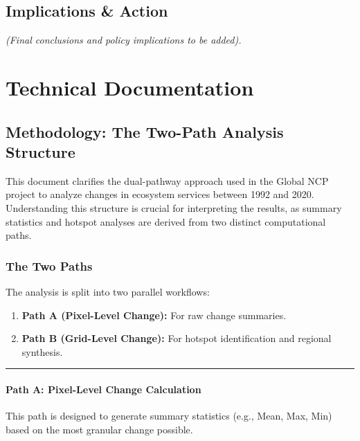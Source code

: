 \documentclass[
  letterpaper,
  DIV=11,
  numbers=noendperiod]{scrreprt}
\providecommand{\tightlist}{%
  \setlength{\itemsep}{0pt}\setlength{\parskip}{0pt}}
\begin{document}
\chapter{Implications \& Action}\label{implications-action}

\emph{(Final conclusions and policy implications to be added).}

\part{Technical Documentation}

\chapter{Methodology: The Two-Path Analysis
Structure}\label{methodology-the-two-path-analysis-structure}

This document clarifies the dual-pathway approach used in the Global NCP
project to analyze changes in ecosystem services between 1992 and 2020.
Understanding this structure is crucial for interpreting the results, as
summary statistics and hotspot analyses are derived from two distinct
computational paths.

\section{The Two Paths}\label{the-two-paths}

The analysis is split into two parallel workflows:

\begin{enumerate}
\def\labelenumi{\arabic{enumi}.}
\tightlist
\item
  \textbf{Path A (Pixel-Level Change):} For raw change summaries.
\item
  \textbf{Path B (Grid-Level Change):} For hotspot identification and
  regional synthesis.
\end{enumerate}

\begin{center}\rule{0.5\linewidth}{0.5pt}\end{center}

\subsection{Path A: Pixel-Level Change
Calculation}\label{path-a-pixel-level-change-calculation}

This path is designed to generate summary statistics (e.g., Mean, Max,
Min) based on the most granular change possible.
\end{document}
